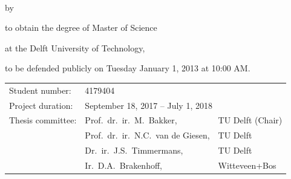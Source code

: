 \begin{titlepage}


\begin{center}

 
{\makeatletter
\largetitlestyle\color{tudelft-cyan}\fontsize{32}{32}\selectfont\@title
\makeatother}

\bigskip
\bigskip

{\makeatletter
\ifx\@subtitle\undefined\else
    \bigskip
   {\tudsffamily\fontsize{20}{20}\selectfont\@subtitle} \\
\fi
\makeatother}

\bigskip
\bigskip

by

\bigskip
\bigskip

{\makeatletter
\largetitlestyle\fontsize{16}{16}\selectfont\@author
\makeatother}

\bigskip
\bigskip

to obtain the degree of Master of Science

at the Delft University of Technology,

to be defended publicly on Tuesday January 1, 2013 at 10:00 AM.

\vfill

\begin{tabular}{lll}
    Student number: & 4179404 \\
    Project duration: & \multicolumn{2}{l}{September 18, 2017 -- July 1, 2018} \\
    Thesis committee: & Prof.\ dr.\ ir.\ M.\ Bakker, & TU Delft (Chair) \\
		& Prof.\ dr.\ ir.\ N.C.\ van de Giesen, & TU Delft \\        
        & Dr.\ ir.\ J.S.\ Timmermans, & TU Delft \\
        & Ir.\ D.A.\ Brakenhoff, & Witteveen+Bos
\end{tabular}


\end{center}
\end{titlepage}

